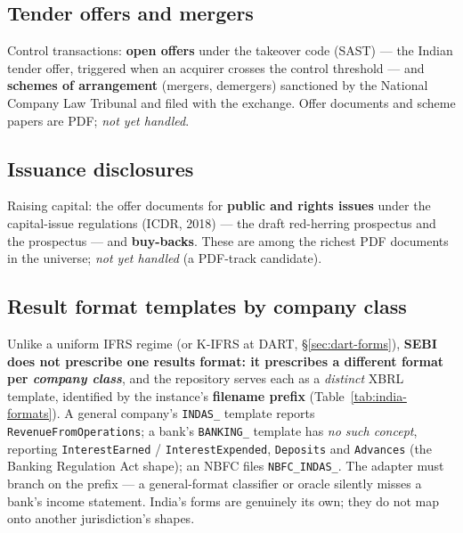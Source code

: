 \documentclass[11pt,a4paper]{report}
\begin{document}
\subsection{Tender offers and mergers}\label{sec:india-tender}
Control transactions: \textbf{open offers} under the takeover code (SAST) --- the Indian tender offer,
triggered when an acquirer crosses the control threshold --- and \textbf{schemes of arrangement} (mergers,
demergers) sanctioned by the National Company Law Tribunal and filed with the exchange. Offer documents and
scheme papers are PDF; \emph{not yet handled}.

\subsection{Issuance disclosures}\label{sec:india-issuance}
Raising capital: the offer documents for \textbf{public and rights issues} under the capital-issue
regulations (ICDR, 2018) --- the draft red-herring prospectus and the prospectus --- and \textbf{buy-backs}.
These are among the richest PDF documents in the universe; \emph{not yet handled} (a PDF-track candidate).

\subsection{Result format templates by company class}\label{sec:india-formats}
Unlike a uniform IFRS regime (or K-IFRS at DART, \S\ref{sec:dart-forms}), \textbf{SEBI does not prescribe one
results format: it prescribes a different format per \emph{company class}}, and the repository serves each as
a \emph{distinct} XBRL template, identified by the instance's \textbf{filename prefix}
(Table~\ref{tab:india-formats}). A general company's \texttt{INDAS\_} template reports
\texttt{RevenueFromOperations}; a bank's \texttt{BANKING\_} template has \emph{no such concept}, reporting
\texttt{InterestEarned} / \texttt{InterestExpended}, \texttt{Deposits} and \texttt{Advances} (the Banking
Regulation Act shape); an NBFC files \texttt{NBFC\_INDAS\_}. The adapter must branch on the prefix --- a
general-format classifier or oracle silently misses a bank's income statement. India's forms are genuinely
its own; they do not map onto another jurisdiction's shapes.
\end{document}
